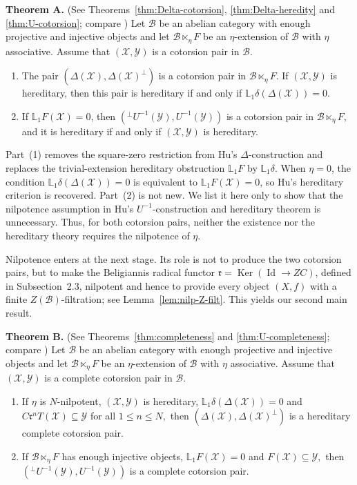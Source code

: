 \documentclass[11pt,reqno]{amsart}
\numberwithin{equation}{section}
\newcommand{\cB}{\mathcal B}
\newcommand{\cX}{\mathcal X}
\newcommand{\cY}{\mathcal Y}
\newcommand{\Ker}{\operatorname{Ker}}
\newcommand{\Id}{\operatorname{Id}}
\newcommand{\radf}{\mathfrak r}
\begin{document}
\medskip
\noindent\textbf{Theorem A.}
(See Theorems~\ref{thm:Delta-cotorsion}, \ref{thm:Delta-heredity} and \ref{thm:U-cotorsion}; compare \cite[Theorem~A]{Hu})
Let $\cB$ be an abelian category with enough projective and injective objects and let $\cB\ltimes_\eta F$ be an $\eta$-extension of $\cB$ with $\eta$ associative. Assume that $(\cX,\cY)$ is a cotorsion pair in $\cB$.
\begin{enumerate}
\item The pair
$
(\Delta(\cX),\Delta(\cX)^\perp)
$
is a cotorsion pair in $\cB\ltimes_\eta F$. If $(\cX,\cY)$ is hereditary, then this pair is hereditary if and only if
$
\mathbb{L}_1\delta(\Delta(\cX))=0.
$
\item If $\mathbb{L}_1F(\cX)=0$, then
$
({}^\perp U^{-1}(\cY),U^{-1}(\cY))
$
is a cotorsion pair in $\cB\ltimes_\eta F$, and it is hereditary if and only if $(\cX,\cY)$ is hereditary.
\end{enumerate}
\medskip

Part~(1) removes the square-zero restriction from Hu's $\Delta$-construction and replaces the trivial-extension hereditary obstruction $\mathbb{L}_1F$ by  $\mathbb{L}_1\delta$. When $\eta=0$, the condition $\mathbb{L}_1\delta(\Delta(\cX))=0$ is equivalent to $\mathbb{L}_1F(\cX)=0$, so Hu's hereditary criterion is recovered. Part~(2) is not new. We list it here only to show that the nilpotence assumption in Hu's $U^{-1}$-construction and hereditary theorem is unnecessary. Thus, for both cotorsion pairs, neither the existence nor the hereditary theory requires the nilpotence of $\eta$.

Nilpotence enters at the next stage. Its role is not to produce the two cotorsion pairs, but to make the Beligiannis radical functor $\radf=\Ker(\Id\to ZC)$, defined in Subsection~2.3, nilpotent and hence to provide every object $(X,f)$ with a finite $Z(\cB)$-filtration; see Lemma~\ref{lem:nilp-Z-filt}. This yields our second main result.

\medskip
\noindent\textbf{Theorem B.}
(See Theorems~\ref{thm:completeness} and \ref{thm:U-completeness}; compare \cite[Theorem~B]{Hu})
Let $\cB$ be an abelian category with enough projective and injective objects and let $\cB\ltimes_\eta F$ be an $\eta$-extension of $\cB$ with $\eta$ associative. Assume that $(\cX,\cY)$ is a complete cotorsion pair in $\cB$.
\begin{enumerate}
\item If $\eta$ is $N$-nilpotent, $(\cX,\cY)$ is hereditary,
$
\mathbb{L}_1\delta(\Delta(\cX))=0$ and
$C\radf^nT(\cX)\subseteq\cY$ for all $1\le n\le N,
$
then $(\Delta(\cX),\Delta(\cX)^\perp)$ is a hereditary complete cotorsion pair.
\item If $\cB\ltimes_\eta F$ has enough injective objects,
$
\mathbb{L}_1F(\cX)=0
$ and
$
F(\cX)\subseteq \cY,
$
then $({}^\perp U^{-1}(\cY),U^{-1}(\cY))$ is a complete cotorsion pair.
\end{enumerate}
\medskip
\end{document}
